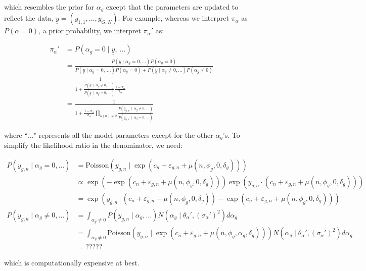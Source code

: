 \documentclass{article}\usepackage{graphicx, color}
\providecommand{\e}{\varepsilon}
\begin{document}
\begin{flushleft}
which resembles the prior for $\alpha_g$ except that the parameters are updated to reflect the data, $\underline{y}  = (y_{1, 1}, \ldots, y_{G, N})$. For example, whereas we interpret $\pi_\alpha$ as $P(\alpha = 0)$, a prior probability, we interpret $\pi_\alpha'$ as:

\begin{align*}
\pi_\alpha' &= P(\alpha_g = 0 \mid \underline{y}, \ \ldots) \\
& = \frac{P(\underline{y} \mid \alpha_g = 0,  \ldots) P(\alpha_g = 0)}{P(\underline{y} \mid \alpha_g = 0, \ \ldots) P(\alpha_g = 0) + P(\underline{y} \mid \alpha_g \ne 0,  \ldots) P(\alpha_g \ne 0)} \\
&= \frac{1}{1 + \frac{P(  \underline{y} \ \mid \ \alpha_g \ne 0, \ \ldots) }{P( \underline{y} \ \mid \ \alpha_g = 0, \ \ldots) } \frac{1 - \pi_\alpha}{\pi_\alpha}} \\
&= \frac{1}{1 + \frac{1 - \pi_\alpha}{\pi_\alpha} \prod_{k(n) \ne 2}  \frac{ P( y_{g, n} \ \mid \ \alpha_g \ne 0, \ \ldots) }{P(y_{g, n} \ \mid \ \alpha_g = 0, \ \ldots) } }
\end{align*}

where ``$\ldots$" represents all the model parameters except for the other $\alpha_g$'s. To simplify the likelihood ratio in the denominator, we need:


\begin{align*}
P(y_{g, n} \mid \alpha_g = 0, \ldots) &= \text{Poisson}(y_{g, n} \mid \exp(c_n + \e_{g, n} + \mu(n, \phi_g, 0, \delta_g)))  \\
&\propto \exp(-\exp(c_n + \e_{g, n} + \mu(n, \phi_g, 0, \delta_g))) \exp(y_{g, n} \cdot (c_n + \e_{g, n} + \mu(n, \phi_g, 0, \delta_g))) \\
&= \exp(y_{g, n} \cdot (c_n + \e_{g, n} + \mu(n, \phi_g, 0, \delta_g)) - \exp(c_n + \e_{g, n} + \mu(n, \phi_g, 0, \delta_g))) \\
P(y_{g, n} \mid \alpha_g \ne 0, \ldots)  &= \int_{\alpha_g \ne 0} P(y_{g, n} \mid \alpha_g , \ldots) N(\alpha_g \mid \theta_\alpha', (\sigma_\alpha')^2) d \alpha_g \\
&=  \int_{\alpha_g \ne 0}  \text{Poisson}(y_{g, n} \mid \exp(c_n + \e_{g, n} + \mu(n, \phi_g, \alpha_g, \delta_g)))  N(\alpha_g \mid \theta_\alpha', (\sigma_\alpha')^2) d \alpha_g \\
&= ?????
\end{align*}

which is computationally expensive at best. \newline


\end{flushleft}
\end{document}
